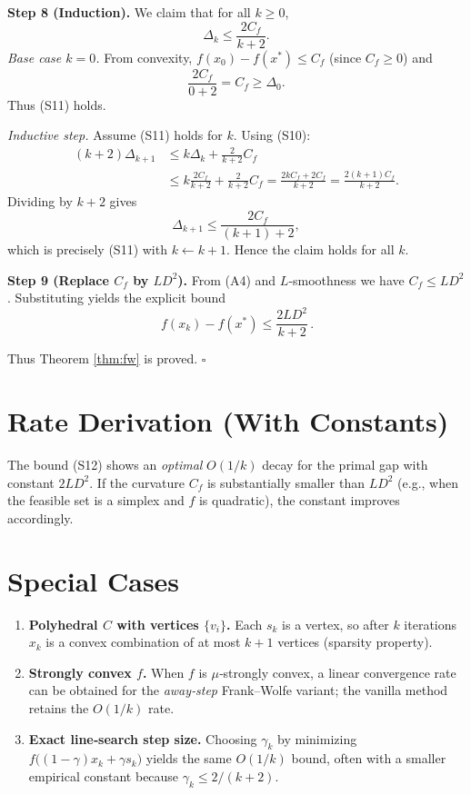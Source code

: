 \documentclass{article}
\begin{document}
\noindent\textbf{Step 8 (Induction).}  
We claim that for all $k\ge0$,
\[
\Delta_k \le \frac{2C_f}{k+2}.
\tag{S11}
\]
\emph{Base case $k=0$.}  
From convexity, $f(x_0)-f(x^{*})\le C_f$ (since $C_f\ge 0$) and
\[
\frac{2C_f}{0+2}=C_f \ge \Delta_0 .
\]
Thus (S11) holds.

\emph{Inductive step.} Assume (S11) holds for $k$.  Using (S10):
\[
\begin{aligned}
(k+2)\Delta_{k+1}
&\le k\Delta_k + \frac{2}{k+2}C_f \\
&\le k\frac{2C_f}{k+2} + \frac{2}{k+2}C_f
= \frac{2kC_f+2C_f}{k+2}
= \frac{2(k+1)C_f}{k+2}.
\end{aligned}
\]
Dividing by $k+2$ gives
\[
\Delta_{k+1}\le \frac{2C_f}{(k+1)+2},
\]
which is precisely (S11) with $k\leftarrow k+1$.  Hence the claim holds for all $k$.

\noindent\textbf{Step 9 (Replace $C_f$ by $L D^{2}$).}  
From (A4) and $L$‑smoothness we have $C_f\le L D^{2}$.  Substituting yields the explicit bound
\[
\boxed{\,f(x_k)-f(x^{*}) \le \frac{2L D^{2}}{k+2}\,}.
\tag{S12}
\]

Thus Theorem \ref{thm:fw} is proved. \hfill $\square$

\section*{Rate Derivation (With Constants)}
The bound (S12) shows an \emph{optimal} $O(1/k)$ decay for the primal gap with constant $2LD^{2}$.  If the curvature $C_f$ is substantially smaller than $L D^{2}$ (e.g., when the feasible set is a simplex and $f$ is quadratic), the constant improves accordingly.

\section*{Special Cases}
\begin{enumerate}[label=\arabic*)]
\item \textbf{Polyhedral $C$ with vertices $\{v_i\}$.}  Each $s_k$ is a vertex, so after $k$ iterations $x_k$ is a convex combination of at most $k+1$ vertices (sparsity property).

\item \textbf{Strongly convex $f$.}  When $f$ is $\mu$‑strongly convex, a linear convergence rate can be obtained for the \emph{away‑step} Frank–Wolfe variant; the vanilla method retains the $O(1/k)$ rate.

\item \textbf{Exact line‑search step size.}  Choosing $\gamma_k$ by minimizing $f\bigl((1-\gamma)x_k+\gamma s_k\bigr)$ yields the same $O(1/k)$ bound, often with a smaller empirical constant because $\gamma_k\le 2/(k+2)$.
\end{enumerate}
\end{document}
